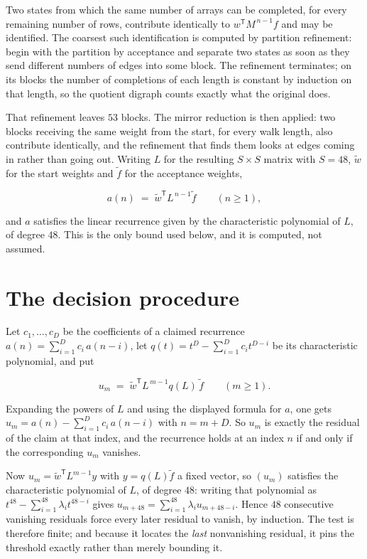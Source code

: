 \documentclass[11pt]{article}
\theoremstyle{definition}
\begin{document}
Two states from which the same number of arrays can be completed, for every remaining number of rows, contribute identically to $w^{\mathsf T}M^{\,n-1}f$ and may be identified. The coarsest such identification is computed by partition refinement: begin with the partition by acceptance and separate two states as soon as they send different numbers of edges into some block. The refinement terminates; on its blocks the number of completions of each length is constant by induction on that length, so the quotient digraph counts exactly what the original does.

That refinement leaves $53$ blocks. The mirror reduction is then applied: two blocks receiving the same weight from the start, for every walk length, also contribute identically, and the refinement that finds them looks at edges coming in rather than going out. Writing $L$ for the resulting $S \times S$ matrix with $S = 48$, $\tilde w$ for the start weights and $\tilde f$ for the acceptance weights,

\[a(n) \;=\; \tilde w^{\mathsf T} L^{\,n-1} \tilde f \qquad (n \ge 1),\]

and $a$ satisfies the linear recurrence given by the characteristic polynomial of $L$, of degree $48$. This is the only bound used below, and it is computed, not assumed.

\section{The decision procedure}

Let $c_1,\dots,c_D$ be the coefficients of a claimed recurrence $a(n) = \sum_{i=1}^{D} c_i\,a(n-i)$, let $q(t) = t^{D} - \sum_{i=1}^{D} c_i t^{D-i}$ be its characteristic polynomial, and put

\[u_m \;=\; \tilde w^{\mathsf T} L^{\,m-1} q(L)\,\tilde f \qquad (m \ge 1).\]

Expanding the powers of $L$ and using the displayed formula for $a$, one gets $u_m = a(n) - \sum_{i=1}^{D} c_i\,a(n-i)$ with $n = m + D$. So $u_m$ is exactly the residual of the claim at that index, and the recurrence holds at an index $n$ if and only if the corresponding $u_m$ vanishes.

Now $u_m = \tilde w^{\mathsf T} L^{m-1} y$ with $y = q(L)\tilde f$ a fixed vector, so $(u_m)$ satisfies the characteristic polynomial of $L$, of degree $48$: writing that polynomial as $t^{48} - \sum_{i=1}^{48} \lambda_i t^{48-i}$ gives $u_{m+48} = \sum_{i=1}^{48} \lambda_i u_{m+48-i}$. Hence $48$ consecutive vanishing residuals force every later residual to vanish, by induction. The test is therefore finite; and because it locates the {\itshape last} nonvanishing residual, it pins the threshold exactly rather than merely bounding it.
\end{document}
